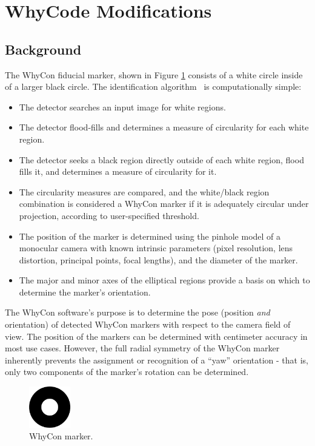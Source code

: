 \section{WhyCode Modifications}
\label{section:whycode_modifications}

\subsection{Background}

The WhyCon fiducial marker, shown in Figure \ref{fig:whycon} consists of a white circle inside of a larger black circle.
The identification algorithm~\cite{whycon_paper}\cite{whycode_paper} is computationally simple:
\begin{itemize}
    \item The detector searches an input image for white regions.
    \item The detector flood-fills and determines a measure of circularity for each white region.
    \item The detector seeks a black region directly outside of each white region, flood fills it, and determines a measure of circularity for it.
    \item The circularity measures are compared, and the white/black region combination is considered a WhyCon marker if it is adequately circular under projection, according to user-specified threshold.
    \item The position of the marker is determined using the pinhole model of a monocular camera with known intrinsic parameters
            (pixel resolution, lens distortion, principal points, focal lengths), and the diameter of the marker.
    \item The major and minor axes of the elliptical regions provide a basis on which to determine the marker's orientation.
\end{itemize}

The WhyCon software's purpose is to determine the pose (position \textit{and} orientation) of detected WhyCon markers
with respect to the camera field of view.
The position of the markers can be determined with centimeter accuracy in most use cases.
However, the full radial symmetry of the WhyCon marker inherently prevents the assignment or recognition
of a ``yaw'' orientation - that is, only two components of the marker's rotation can be determined.

\begin{figure}
    \centering
    \includegraphics[width=0.16\textwidth]{images/whycon_example.png}
    \caption{WhyCon marker.}
    \label{fig:whycon}
\end{figure}

